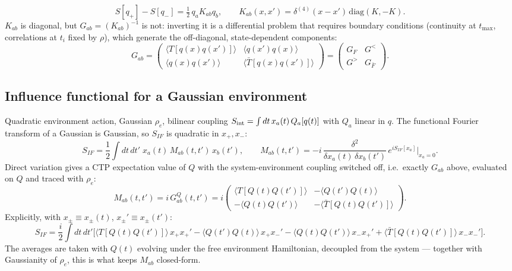 \documentclass[12pt,a4paper,oneside]{article}
\numberwithin{equation}{section}   %
\begin{document}
\begin{equation}
S[q_+]-S[q_-] = \tfrac12\,q_a K_{ab} q_b, \qquad
K_{ab}(x,x') = \delta^{(4)}(x-x')\,\mathrm{diag}(K,-K).
\end{equation}
$K_{ab}$ is diagonal, but $G_{ab}=(K_{ab})^{-1}$ is not: inverting it is a differential problem that requires boundary conditions (continuity at $t_{\max}$, correlations at $t_i$ fixed by $\rho$), which generate the off-diagonal, state-dependent components:
\begin{equation}
G_{ab} =
\begin{pmatrix}
\langle T[q(x)q(x')]\rangle & \langle q(x')q(x)\rangle \\
\langle q(x)q(x')\rangle & \langle \bar T[q(x)q(x')]\rangle
\end{pmatrix}
= \begin{pmatrix} G_F & G^< \\ G^> & G_{\bar F}\end{pmatrix}.
\end{equation}

\subsection*{Influence functional for a Gaussian environment}

Quadratic environment action, Gaussian $\rho_e$, bilinear coupling $S_{\rm int}=\int dt\,x_a(t)\,Q_a[q(t)]$ with $Q_a$ linear in $q$. The functional Fourier transform of a Gaussian is Gaussian, so $S_{IF}$ is quadratic in $x_+,x_-$:
\begin{equation}
S_{IF} = \frac12\int dt\,dt'\;x_a(t)\,M_{ab}(t,t')\,x_b(t'),
\qquad
M_{ab}(t,t') = -i\,\frac{\delta^2}{\delta x_a(t)\,\delta x_b(t')}\,e^{iS_{IF}[x_a]}\Big|_{x_a=0}.
\end{equation}
Direct variation gives a CTP expectation value of $Q$ with the system-environment coupling switched off, i.e.\ exactly $G_{ab}$ above, evaluated on $Q$ and traced with $\rho_e$:
\begin{equation}
M_{ab}(t,t') = i\,G_{ab}^Q(t,t') = i
\begin{pmatrix}
\langle T[Q(t)Q(t')]\rangle & -\langle Q(t')Q(t)\rangle \\
-\langle Q(t)Q(t')\rangle & -\langle \bar T[Q(t)Q(t')]\rangle
\end{pmatrix}.
\end{equation}
Explicitly, with $x_\pm\equiv x_\pm(t)$, $x_\pm'\equiv x_\pm(t')$:
\begin{equation}
S_{IF} = \frac{i}{2}\int dt\,dt'\Big[
\langle T[Q(t)Q(t')]\rangle\,x_+x_+'
-\langle Q(t')Q(t)\rangle\,x_+x_-'
-\langle Q(t)Q(t')\rangle\,x_-x_+'
+\langle \bar T[Q(t)Q(t')]\rangle\,x_-x_-'
\Big].
\end{equation}
The averages are taken with $Q(t)$ evolving under the free environment Hamiltonian, decoupled from the system — together with Gaussianity of $\rho_e$, this is what keeps $M_{ab}$ closed-form.
\end{document}
